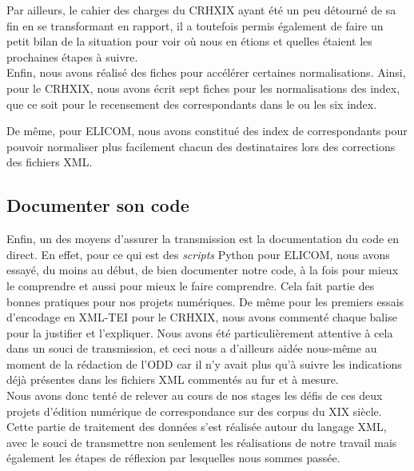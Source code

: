 Par ailleurs, le cahier des charges du CRHXIX ayant été un peu détourné de sa fin en se transformant en rapport, il a toutefois permis également de faire un petit bilan de la situation pour voir où nous en étions et quelles étaient les prochaines étapes à suivre. \\

Enfin, nous avons réalisé des fiches pour accélérer certaines normalisations. Ainsi, pour le CRHXIX, nous avons écrit sept fiches pour les normalisations des index, que ce soit pour le recensement des correspondants dans le  ou les six index.

De même, pour ELICOM, nous avons constitué des index de correspondants pour pouvoir normaliser plus facilement chacun des destinataires lors des corrections des fichiers XML.

\subsection{Documenter son code}

Enfin, un des moyens d'assurer la transmission est la documentation du code en direct. En effet, pour ce qui est des \emph{scripts} Python pour ELICOM, nous avons essayé, du moins au début, de bien documenter notre code, à la fois pour mieux le comprendre et aussi pour mieux le faire comprendre. Cela fait partie des bonnes pratiques pour nos projets numériques. De même pour les premiers essais d'encodage en XML-TEI pour le CRHXIX, nous avons commenté chaque balise pour la justifier et l'expliquer. Nous avons été particulièrement attentive à cela dans un souci de transmission, et ceci nous a d'ailleurs aidée nous-même au moment de la rédaction de l'ODD car il n'y avait plus qu'à suivre les indications déjà présentes dans les fichiers XML commentés au fur et à mesure.\\


Nous avons donc tenté de relever au cours de nos stages les défis de ces deux projets d'édition numérique de correspondance sur des corpus du XIX siècle. Cette partie de traitement des données s'est réalisée autour du langage XML, avec le souci de transmettre non seulement les réalisations de notre travail mais également les étapes de réflexion par lesquelles nous sommes passée.
